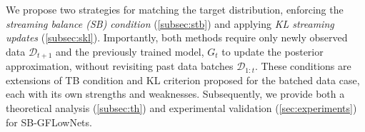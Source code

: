 \documentclass{article}
\theoremstyle{plain}
\theoremstyle{definition}
\theoremstyle{remark}
\theoremstyle{remark}
\begin{document}
We propose two strategies for matching the target distribution, enforcing the \textit{streaming balance (SB) condition} (\autoref{subsec:stb}) and applying \textit{KL streaming updates} (\autoref{subsec:skl}). Importantly, both methods require only newly observed data $\mathcal{D}_{t + 1}$ and the previously trained model, $G_{t}$ to update the posterior approximation, without revisiting past data batches $\mathcal{D}_{1:t}$. These conditions are extensions of TB condition and KL criterion proposed for the batched data case, each with its own strengths and weaknesses.
% 
% 
% 
Subsequently, we provide both a theoretical analysis (\autoref{subsec:th}) and experimental validation (\autoref{sec:experiments}) for SB-GFLowNets.

\end{document}
